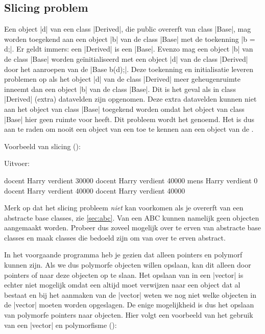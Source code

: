 \begin{cpplstShortInline}
\section{Slicing problem}
\label{slicing probleem} 
Een object |d| van een class |Derived|, die public overerft van class |Base|, mag worden toegekend aan een object |b| van de class |Base| met de toekenning |b = d;|.
Er geldt immers: een |Derived| is een |Base|.
Evenzo mag een object |b| van de class |Base| worden geïnitialiseerd met een object |d| van de class |Derived| door het aanroepen van de  |Base b(d);|.
Deze toekenning en initialisatie leveren problemen op als het object |d| van de class |Derived| meer geheugenruimte inneemt dan een object |b| van de class |Base|.
Dit is het geval als in class |Derived| (extra) datavelden zijn opgenomen.
Deze extra datavelden kunnen niet aan het object van class |Base| toegekend worden omdat het object van class |Base| hier geen ruimte voor heeft.
Dit probleem wordt het \emph{} genoemd.
Het is dus aan te raden om nooit een object van een  toe te kennen aan een object van de .
 
Voorbeeld van slicing ():

Uitvoer:
\begin{coutput}
docent Harry verdient 30000
docent Harry verdient 40000
mens Harry verdient 0
docent Harry verdient 40000
docent Harry verdient 40000
\end{coutput}

Merk op dat het slicing probleem \emph{niet} kan voorkomen als je overerft van een abstracte base classes, zie \cref{sec:abc}.
Van een ABC kunnen namelijk geen objecten aangemaakt worden.
Probeer dus zoveel mogelijk over te erven van abstracte base classes en maak classes die bedoeld zijn om van over te erven abstract.

In het voorgaande programma heb je gezien dat alleen pointers en  polymorf kunnen zijn. 
Als we dus polymorfe objecten willen opslaan, kan dit alleen door pointers of  naar deze objecten op te slaan.
Het opslaan van  in een |vector| is echter niet mogelijk omdat een  altijd moet verwijzen naar een object dat al bestaat en bij het aanmaken van de |vector| weten we nog niet welke objecten in de |vector| moeten worden opgeslagen.
De enige mogelijkheid is dus het opslaan van polymorfe pointers naar objecten.
Hier volgt een voorbeeld van het gebruik van een |vector| en polymorfisme ():


\end{cpplstShortInline}
